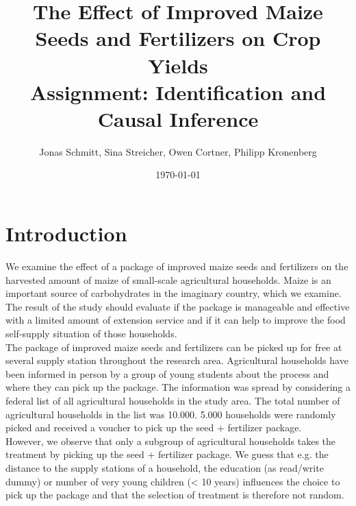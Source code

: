 



\title{\huge The Effect of Improved Maize Seeds and Fertilizers on Crop Yields \\
\LARGE Assignment: Identification and Causal Inference}

\author{Jonas Schmitt, Sina Streicher, Owen Cortner, Philipp Kronenberg}

\date{\small \today}

\clearpage\maketitle
\thispagestyle{empty}

\renewcommand{\labelenumi}{\alph{enumi})}

\section{Introduction} \label{sec:introduction}

We examine the effect of a package of improved maize seeds and fertilizers on the harvested amount of maize of small-scale agricultural households. Maize is an important source of carbohydrates in the imaginary country, which we examine. The result of the study should evaluate if the package is manageable and effective with a limited amount of extension service and if it can help to improve the food self-supply situation of those households. \\


The package of improved maize seeds and fertilizers can be picked up for free at several supply station throughout the research area. Agricultural households have been informed in person by a group of young students about the process and where they can pick up the package. The information was spread by considering a federal list of all agricultural households in the study area. The total number of agricultural households in the list was 10.000. 5.000 households were randomly picked and received a voucher to pick up the seed + fertilizer package. \\

However, we observe that only a subgroup of agricultural households takes the treatment by picking up the seed + fertilizer package. We guess that e.g. the distance to the supply stations of a household, the education (as read/write dummy) or number of very young children (< 10 years) influences the choice to pick up the package and that the selection of treatment is therefore not random. \\

